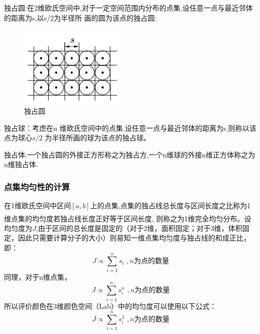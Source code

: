 \documentclass{article}
\newcommand{\upcite}[1]{\textsuperscript{\textsuperscript{\cite{#1}}}}
\begin{document}
 独占圆:在2维欧氏空间中,对于一定空间范围内分布的点集,设任意一点与最近邻体的距离为s,以s/2为半径所
 画的圆为该点的独占圆;
   \begin{figure}[H]
 	\centering
 	\includegraphics[width=0.45\textwidth]{img/独占圆.png}
 	\caption{独占圆}
 	\label{独占圆}
 \end{figure}
 独占球：考虑在n 维欧氏空间中的点集,设任意一点与最近邻体的距离为s,则称以该点为球心$s/2$ 为半径所画的球为该点的独占球。
 
 独占体:一个独占圆的外接正方形称之为独占方,一个n维球的外接n维正方体称之为n维独占体.
 
 \subsubsection{点集均匀性的计算}
 在1维欧氏空间中区间$[a,b]$上的点集,点集的独占线总长度与区间长度之比称为1 维点集的均匀度若独占线长度正好等于区间长度, 则称之为1维完全均匀分布\upcite{shenErWeiLiZiFenBuJunYunDuCeSuanFangFaYanJiu1993}。设均匀度为$J$,由于区间的总长度是固定的（对于2维，面积固定；对于3维，体积固定，因此只需要计算分子的大小）则易知一维点集均匀度与独占线的和成正比，即：
 \begin{equation}
 J \propto \sum_{i=1}^{n} s_{i}\,\, ,n\text{为点的数量}
 \end{equation}
 同理，对于n维点集，
 \begin{equation}
 J\propto \sum_{i=1}^n{s}_{i}^{n}\,\, ,n\text{为点的数量}
 \end{equation}
 所以评价颜色在3维颜色空间（Lab）中的均匀度可以使用以下公式：
 \begin{equation}
 J \propto  \sum_{i=1}^{n} s_{i}^{3}\,\, ,n\text{为点的数量}
 \label{j3}
 \end{equation}
 
\end{document}

